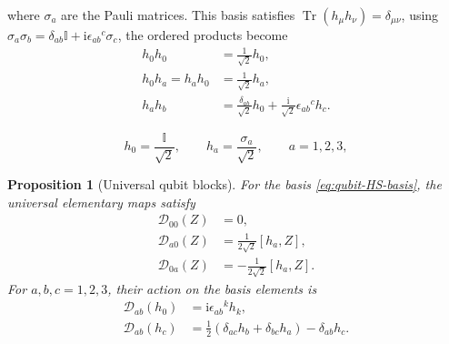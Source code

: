 \documentclass[10pt,a4paper]{amsart}
\newtheorem{proposition}{Proposition}
\begin{document}
where \(\sigma_a\) are the Pauli matrices. This basis satisfies \(\operatorname{Tr}(h_\mu h_\nu) = \delta_{\mu\nu}\), using \(\sigma_a\sigma_b = \delta_{ab}\mathbb I + \mathrm{i}\epsilon_{ab}{}^c\sigma_c\), the ordered products become
\begin{subequations}\label{eq:qubit-ordered-products}
\begin{align}
    h_0h_0
    &=
    \frac1{\sqrt2}h_0,
    \\
    h_0h_a
    =
    h_ah_0
    &=
    \frac1{\sqrt2}h_a,
    \\
    h_ah_b
    &=
    \frac{\delta_{ab}}{\sqrt2}h_0
    +
    \frac{\mathrm{i}}{\sqrt2}
    \epsilon_{ab}{}^c h_c.
\end{align}
\end{subequations}

\begin{equation}
    h_0
    =
    \frac{\mathbb I}{\sqrt2},
    \qquad
    h_a
    =
    \frac{\sigma_a}{\sqrt2},
    \qquad
    a=1,2,3,
\end{equation}

\begin{proposition}[Universal qubit blocks]
For the basis \eqref{eq:qubit-HS-basis}, the universal elementary maps satisfy
\begin{subequations}\label{eq:qubit-universal-D-blocks}
\begin{align}
    \mathcal D_{00}(Z)
    &=
    0,
    \\
    \mathcal D_{a0}(Z)
    &=
    \frac1{2\sqrt2}
    [h_a,Z],
    \\
    \mathcal D_{0a}(Z)
    &=
    -\frac1{2\sqrt2}
    [h_a,Z].
\end{align}
\end{subequations}
For \(a,b,c=1,2,3\), their action on the basis elements is
\begin{subequations}\label{eq:qubit-Dab-action}
\begin{align}
    \mathcal D_{ab}(h_0)
    &=
    \mathrm{i}\epsilon_{ab}{}^k h_k,
    \label{eq:qubit-Dab-h0}
    \\
    \mathcal D_{ab}(h_c)
    &=
    \frac12
    \left(
    \delta_{ac}h_b
    +
    \delta_{bc}h_a
    \right)
    -
    \delta_{ab}h_c.
    \label{eq:qubit-Dab-hc}
\end{align}
\end{subequations}
\end{proposition}
\end{document}
